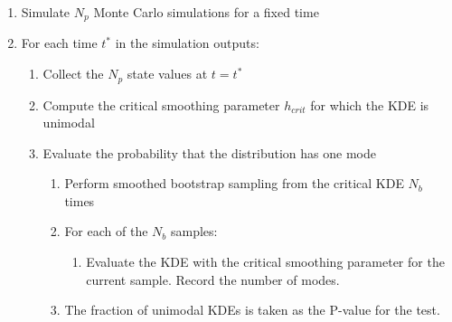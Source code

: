 \documentclass[]{article}
\begin{document}
\begin{enumerate}
\item Simulate $N_p$ Monte Carlo simulations for a fixed time
\item For each time $t^*$ in the simulation outputs:
\begin{enumerate}
	\item Collect the $N_p$ state values at $t = t^*$
	\item Compute the critical smoothing parameter $h_{crit}$ for which the KDE is unimodal
	\item Evaluate the probability that the distribution has one mode
	\begin{enumerate}
		\item Perform smoothed bootstrap sampling from the critical KDE $N_b$ times
		\item For each of the $N_b$ samples:
		\begin{enumerate}
			\item Evaluate the KDE with the critical smoothing parameter for the current sample. Record the number of modes.
		\end{enumerate}
		\item The fraction of unimodal KDEs is taken as the P-value for the test.	
	\end{enumerate}
\end{enumerate}
\end{enumerate}



\end{document}
